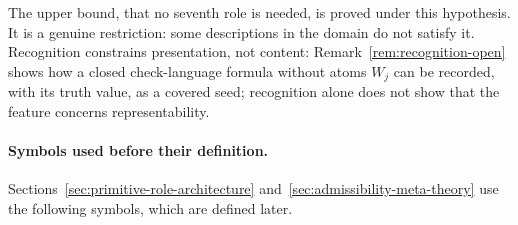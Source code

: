 \begin{itemize}[topsep=2pt,itemsep=1pt]
    The upper bound, that no seventh role is needed, is proved under this
    hypothesis. It is a genuine restriction: some descriptions in the
    domain do not satisfy it. Recognition constrains presentation, not content:
    Remark~\ref{rem:recognition-open} shows how a closed check-language
    formula without atoms \(W_j\) can be recorded, with its truth value, as a
    covered \Ptwo{} seed; recognition alone does not show that the feature
    concerns representability.
\end{itemize}

\paragraph{Symbols used before their definition.} Sections~\ref{sec:primitive-role-architecture}
and~\ref{sec:admissibility-meta-theory} use the following symbols, which are
defined later.
